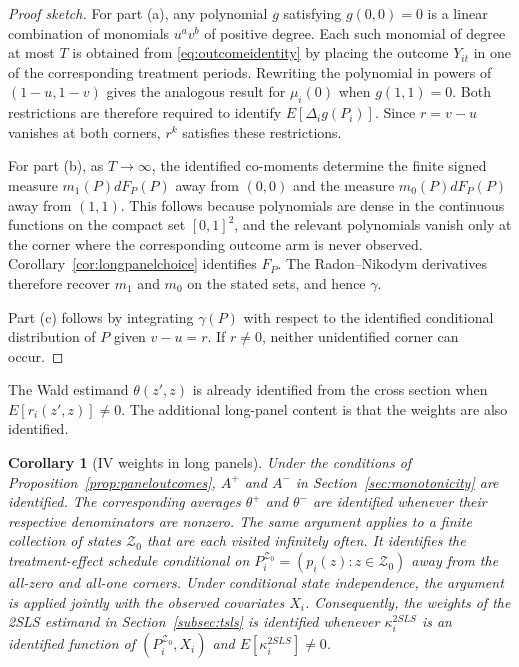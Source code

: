 \documentclass[11pt]{article}
\newtheorem{corollary}{Corollary}
\newcommand{\1}{\mathbf{1}}
\begin{document}
\begin{proof}[Proof sketch]
For part (a), any polynomial $g$ satisfying $g(0,0)=0$ is a linear
combination of monomials $u^av^b$ of positive degree. Each such monomial of
degree at most $T$ is obtained from \eqref{eq:outcomeidentity} by placing the
outcome $Y_{it}$ in one of the corresponding treatment periods. Rewriting the
polynomial in powers of $(1-u,1-v)$ gives the analogous result for $\mu_i(0)$
when $g(1,1)=0$. Both restrictions are therefore required to identify
$E[\Delta_i g(P_i)]$. Since $r=v-u$ vanishes at both corners, $r^k$ satisfies
these restrictions.

For part (b), as $T\to\infty$, the identified co-moments determine the finite
signed measure $m_1(P)dF_P(P)$ away from $(0,0)$ and the measure
$m_0(P)dF_P(P)$ away from $(1,1)$. This follows because polynomials are dense
in the continuous functions on the compact set $[0,1]^2$, and the relevant
polynomials vanish only at the corner where the corresponding outcome arm is
never observed. Corollary~\ref{cor:longpanelchoice}  identifies $F_P$.
The Radon--Nikodym derivatives therefore recover $m_1$ and $m_0$ on the
stated sets, and hence $\gamma$. 

Part (c) follows by integrating $\gamma(P)$
with respect to the identified conditional distribution of $P$ given
$v-u=r$. If $r\neq0$, neither unidentified corner can occur.
\end{proof}

The Wald estimand $\theta(z',z)$ is already identified from the cross section
when $E[r_i(z',z)]\neq0$. The additional long-panel content is that the
weights are also identified.

\begin{corollary}[IV weights in long panels]
\label{cor:paneliv}
Under the conditions of Proposition~\ref{prop:paneloutcomes}, $A^+$ and $A^-$
in Section~\ref{sec:monotonicity} are identified. The corresponding averages
$\theta^+$ and $\theta^-$ are identified whenever their respective
denominators are nonzero. The same argument applies to a finite collection of
states $\mathcal Z_0$ that are each visited infinitely often. It identifies
the treatment-effect schedule conditional on
$P_i^{\mathcal Z_0}=(p_i(z):z\in\mathcal Z_0)$ away from the all-zero and
all-one corners. Under conditional state independence, the argument is applied
jointly with the observed covariates $X_i$. Consequently, the weights of the 2SLS estimand in Section~\ref{subsec:tsls} is identified
whenever $\kappa_i^{2SLS}$ is an identified function of
$(P_i^{\mathcal Z_0},X_i)$ and $E[\kappa_i^{2SLS}]\neq0$.
\end{corollary}
\end{document}
